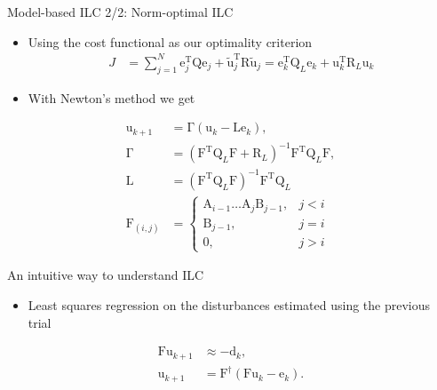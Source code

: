 \documentclass[handout]{beamer}
\newcommand{\boldvec}[1]{\boldsymbol{\mathrm{#1}}}
\let\vec\boldvec
\newcommand{\error}{\vec{e}} %
\newcommand{\linDist}{\vec{d}} %
\newcommand{\sysInput}{\vec{u}} %
\newcommand{\linInput}{\tilde{\sysInput}} %
\newcommand{\qmatrix}{\vec{\Gamma}} %
\newcommand{\lmatrix}{\vec{L}} %
\newcommand{\ValueFunction}{J}
\begin{document}
\begin{frame}{Model-based ILC 2/2: Norm-optimal ILC}
\begin{itemize}
\item Using the cost functional as our optimality criterion
\begin{equation}
\begin{aligned}
\ValueFunction &= \sum_{j=1}^{N} \error_j^{\mathrm{T}}\vec{Q}\error_j + \linInput_j^{\mathrm{T}}\vec{R}\linInput_j = \error_k^{\mathrm{T}}\vec{Q}_L\error_k + \sysInput_k^{\mathrm{T}}\vec{R}_{L}\sysInput_k
\end{aligned}
\end{equation}
\item With Newton's method we get
\end{itemize}
\begin{equation*}
\begin{aligned}
\sysInput_{k+1} &= \qmatrix(\sysInput_{k} - \lmatrix\error_{k}), \\
\qmatrix &= (\vec{F}^{\mathrm{T}}\vec{Q}_L\vec{F} + \vec{R}_L)^{-1}\vec{F}^{\mathrm{T}}\vec{Q}_L\vec{F}, \\
\lmatrix &= (\vec{F}^{\mathrm{T}}\vec{Q}_L\vec{F})^{-1}\vec{F}^{\mathrm{T}}\vec{Q}_L \\
\vec{F}_{(i,j)} &= \left \{
\begin{array}{cc}
\vec{A}_{i-1}\ldots \vec{A}_j\vec{B}_{j-1}, & j < i \\ 
\vec{B}_{j-1}, & j = i \\
\vec{0}, & j > i 
\end{array} \right.
\end{aligned}
\end{equation*}
\end{frame}
%
\begin{frame}{An intuitive way to understand ILC}
\begin{itemize}
\item Least squares regression on the disturbances estimated using the previous trial
\end{itemize}
\begin{equation}
\begin{aligned}
\vec{F}\sysInput_{k+1} &\approx -\linDist_{k}, \\
\sysInput_{k+1} &= \vec{F}^{\dagger}(\vec{F} \sysInput_k - \error_k).
\end{aligned}
\end{equation}
\end{frame}
%
\end{document}

